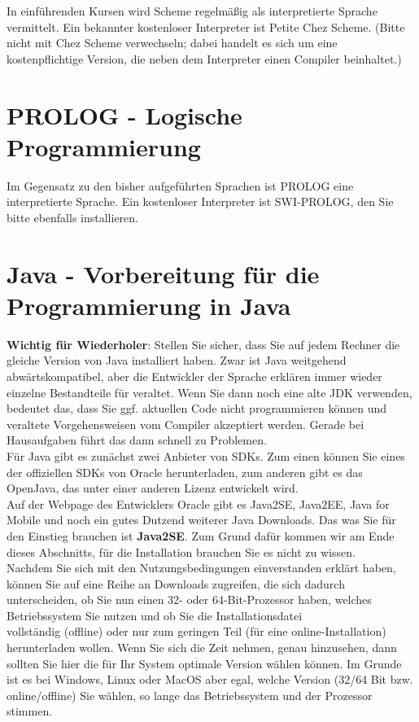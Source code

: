 In einführenden Kursen wird Scheme regelmäßig als interpretierte Sprache vermittelt. Ein bekannter kostenloser Interpreter ist \glqq{}Petite Chez Scheme\grqq{}. (Bitte nicht mit Chez Scheme verwechseln; dabei handelt es sich um eine kostenpflichtige Version, die neben dem Interpreter einen Compiler beinhaltet.)

\section{PROLOG - Logische Programmierung}

Im Gegensatz zu den bisher aufgeführten Sprachen ist PROLOG eine interpretierte Sprache. Ein kostenloser Interpreter ist \glqq{}SWI-PROLOG\grqq{}, den Sie bitte ebenfalls installieren.

\section{Java - Vorbereitung für die Programmierung in Java}

\textbf{Wichtig für Wiederholer}: Stellen Sie sicher, dass Sie auf jedem Rechner die gleiche Version von Java installiert haben. Zwar ist Java weitgehend abwärtskompatibel, aber die Entwickler der Sprache erklären immer wieder einzelne Bestandteile für veraltet. Wenn Sie dann noch eine alte JDK verwenden, bedeutet das, dass Sie ggf. aktuellen Code nicht programmieren können und veraltete Vorgehensweisen vom Compiler akzeptiert werden. Gerade bei Hausaufgaben führt das dann schnell zu Problemen.\\

Für Java gibt es zunächst zwei Anbieter von SDKs. Zum einen können Sie eines der offiziellen SDKs von Oracle herunterladen, zum anderen gibt es das OpenJava, das unter einer anderen Lizenz entwickelt wird.\\

Auf der Webpage des Entwicklers Oracle gibt es Java2SE, Java2EE, Java for Mobile und noch ein gutes Dutzend weiterer Java Downloads. Das was Sie für den Einstieg brauchen ist \textbf{Java2SE}. Zum Grund dafür kommen wir am Ende dieses Abschnitts, für die Installation brauchen Sie es nicht zu wissen.\\

Nachdem Sie sich mit den Nutzungsbedingungen einverstanden erklärt haben, können Sie auf eine Reihe an Downloads zugreifen, die sich dadurch unterscheiden, ob Sie nun einen 32- oder 64-Bit-Prozessor haben, welches Betriebssystem Sie nutzen und ob Sie die Installationsdatei \\ vollständig (offline) oder nur zum geringen Teil (für eine online-Installation) herunterladen wollen. Wenn Sie sich die Zeit nehmen, genau hinzusehen, dann sollten Sie hier die für Ihr System optimale Version wählen können. Im Grunde ist es bei Windows, Linux oder MacOS aber egal, welche Version (32/64 Bit bzw. online/offline) Sie wählen, so lange das Betriebssystem und der Prozessor stimmen.\\


